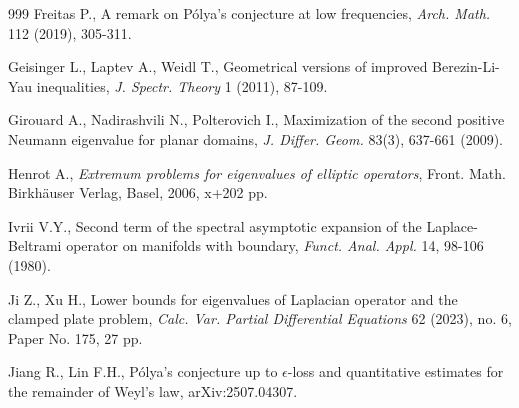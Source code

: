\documentclass[11pt,twoside, leqno]{article}
\numberwithin{equation}{section}
\begin{document}
\begin{thebibliography}{999}
\vspace{-0.3cm}
Freitas P., A remark on P\'olya's conjecture at low frequencies, {\em Arch. Math.} 112 (2019), 305-311.



\vspace{-0.3cm}
Geisinger L., Laptev A., Weidl T.,
Geometrical versions of improved Berezin-Li-Yau inequalities,
{\em J. Spectr. Theory} 1 (2011),  87-109.

\vspace{-0.3cm}
Girouard A., Nadirashvili N., Polterovich I., Maximization of the second positive Neumann eigenvalue for planar domains, {\em J. Differ. Geom.} 83(3), 637-661 (2009).

%
%



 \vspace{-0.3cm}
Henrot A., {\em Extremum problems for eigenvalues of elliptic operators},
Front. Math. Birkh\"auser Verlag, Basel, 2006, x+202 pp.




 \vspace{-0.3cm}
Ivrii V.Y., Second term of the spectral asymptotic expansion of the Laplace-Beltrami operator
on manifolds with boundary, {\em Funct. Anal. Appl.} 14, 98-106 (1980).



 \vspace{-0.3cm}
 Ji Z., Xu H.,
 Lower bounds for eigenvalues of Laplacian operator and the clamped plate problem,
{\em Calc. Var. Partial Differential Equations} 62 (2023), no. 6, Paper No. 175, 27 pp.

 \vspace{-0.3cm}
Jiang R., Lin F.H., P\'olya's conjecture up to $\epsilon$-loss and quantitative estimates for the remainder
of Weyl's law, arXiv:2507.04307.


\end{thebibliography}
\end{document}
